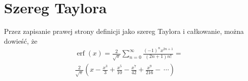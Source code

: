 \documentclass{article}
\begin{document}
\section*{Szereg Taylora}
Przez zapisanie prawej strony definicji jako szereg Taylora i całkowanie, można dowieść, że 
\begin{multline*}
\operatorname {erf} (x)={\frac {2}{\sqrt {\pi }}}\sum _{n=0}^{\infty }{\frac {(-1)^{n}x^{2n+1}}{(2n+1)n!}}=\\{\frac {2}{\sqrt {\pi }}}\left(x-{\frac {x^{3}}{3}}+{\frac {x^{5}}{10}}-{\frac {x^{7}}{42}}+{\frac {x^{9}}{216}}-\ \cdots \right)
\end{multline*}
\end{document}
